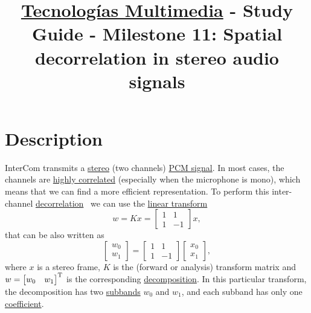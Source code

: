 \title{\href{https://www.ual.es/estudios/grados/presentacion/plandeestudios/asignatura/4015/40154321?idioma=zh_CN}{Tecnologías Multimedia} - Study Guide - Milestone 11: Spatial decorrelation in stereo audio signals}

\maketitle

\section{Description}

InterCom transmits a
\href{https://en.wikipedia.org/wiki/Stereophonic_sound}{stereo} (two
channels)
\href{https://en.wikipedia.org/wiki/Pulse-code_modulation}{PCM
  signal}. In most cases, the channels are
\href{https://en.wikipedia.org/wiki/Binaural_recording}{highly
  correlated} (especially when the microphone is mono), which means
that we can find a more efficient representation. To perform this
inter-channel
\href{https://en.wikipedia.org/wiki/Decorrelation}{decorrelation}~\cite{thinkstats}
we can use the \href{https://en.wikipedia.org/wiki/Linear_map}{linear
  transform}~\cite{strang4linear}
\begin{equation}
  w = Kx = \begin{bmatrix} 1 & 1 \\ 1 & -1 \end{bmatrix}x,
  \label{eq:forward_transform_matrix_form}
\end{equation}
that can be also written as
\begin{equation}
  \begin{bmatrix}
    w_0 \\
    w_1
  \end{bmatrix}
  = 
  \begin{bmatrix} 1 & 1 \\ 1 & -1 \end{bmatrix}
  \begin{bmatrix}
    x_0 \\
    x_1
  \end{bmatrix},
  \label{eq:forward_transform_matrix_form2}
\end{equation}
where $x$ is a stereo frame, $K$ is the (forward or analysis)
transform matrix and $w=\begin{bmatrix} w_0 & w_1\end{bmatrix}^{\text
  T}$ is the corresponding
\href{https://en.wikipedia.org/wiki/Discrete_wavelet_transform#Example_in_image_processing}{decomposition}. In
this particular transform, the decomposition has two
\href{https://en.wikipedia.org/wiki/Sub-band_coding}{subbands} $w_0$
and $w_1$, and each subband has only one
\href{https://web.stanford.edu/class/ee398a/handouts/lectures/07-TransformCoding.pdf}{coefficient}.

